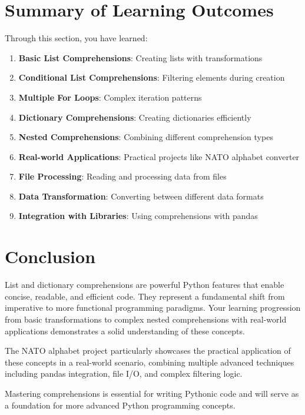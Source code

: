 \documentclass[12pt,a4paper]{article}
\begin{document}
\section{Summary of Learning Outcomes}

Through this section, you have learned:

\begin{enumerate}
    \item \textbf{Basic List Comprehensions}: Creating lists with transformations
    \item \textbf{Conditional List Comprehensions}: Filtering elements during creation
    \item \textbf{Multiple For Loops}: Complex iteration patterns
    \item \textbf{Dictionary Comprehensions}: Creating dictionaries efficiently
    \item \textbf{Nested Comprehensions}: Combining different comprehension types
    \item \textbf{Real-world Applications}: Practical projects like NATO alphabet converter
    \item \textbf{File Processing}: Reading and processing data from files
    \item \textbf{Data Transformation}: Converting between different data formats
    \item \textbf{Integration with Libraries}: Using comprehensions with pandas
\end{enumerate}

\section{Conclusion}

List and dictionary comprehensions are powerful Python features that enable concise, readable, and efficient code. They represent a fundamental shift from imperative to more functional programming paradigms. Your learning progression from basic transformations to complex nested comprehensions with real-world applications demonstrates a solid understanding of these concepts.

The NATO alphabet project particularly showcases the practical application of these concepts in a real-world scenario, combining multiple advanced techniques including pandas integration, file I/O, and complex filtering logic.

Mastering comprehensions is essential for writing Pythonic code and will serve as a foundation for more advanced Python programming concepts.
\end{document}
